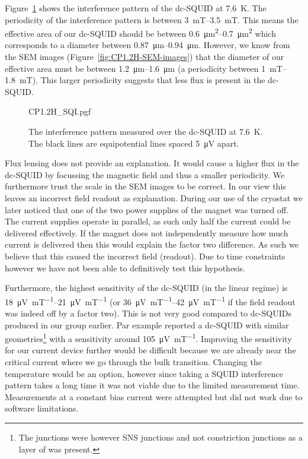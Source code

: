 Figure~\ref{fig:CP1.2H-SQUID-SQI} shows the interference pattern of the dc-SQUID at \qty{7.6}{\kelvin}. The periodicity of the interference pattern is between \qtyrange{3}{3.5}{\milli\tesla}. This means the effective area of our dc-SQUID should be between \qtyrange{0.6}{0.7}{\square\micro\meter} which corresponds to a diameter between \qtyrange{0.87}{0.94}{\micro\meter}. However, we know from the SEM images (Figure~\ref{fig:CP1.2H-SEM-images}) that the diameter of our effective area must be between \qtyrange{1.2}{1.6}{\micro\meter} (a periodicity between \qtyrange{1}{1.8}{\milli\tesla}). This larger periodicity suggests that less flux is present in the dc-SQUID.

\begin{figure}[ht!]
	\centering
	{CP1.2H_SQI.pgf}
	\caption{The interference pattern measured over the dc-SQUID at \qty{7.6}{\kelvin}. The black lines are equipotential lines spaced \qty{5}{\micro\volt} apart.}
	\label{fig:CP1.2H-SQUID-SQI}
\end{figure}

Flux lensing\cite{prigozhin3DSimulationSuperconducting2018} does not provide an explanation. It would cause a higher flux in the dc-SQUID by focussing the magnetic field and thus a smaller periodicity. We furthermore trust the scale in the SEM images to be correct. In our view this leaves an incorrect field readout as explanation. During our use of the cryostat we later noticed that one of the two power supplies of the magnet was turned off. The current supplies operate in parallel, as such only half the current could be delivered effectively. If the magnet does not independently measure how much current is delivered then this would explain the factor two difference. As such we believe that this caused the incorrect field (readout). Due to time constraints however we have not been able to definitively test this hypothesis.

Furthermore, the highest sensitivity of the dc-SQUID (in the linear regime) is \qtyrange{18}{21}{\micro\volt\per\milli\tesla} (or \qtyrange{36}{42}{\micro\volt\per\milli\tesla} if the field readout was indeed off by a factor two). This is not very good compared to dc-SQUIDs produced in our group earlier. Par example \cite{rogSQUIDontipMagneticMicroscopy2022} reported a dc-SQUID with similar geometries\footnote{The junctions were however SNS junctions and not constriction junctions as a layer of  was present.} with a sensitivity around \qty{105}{\micro\volt\per\milli\tesla}. Improving the sensitivity for our current device further would be difficult because we are already near the critical current where we go through the bulk transition. Changing the temperature would be an option, however since taking a SQUID interference pattern takes a long time it was not viable due to the limited measurement time. Measurements at a constant bias current were attempted but did not work due to software limitations.

